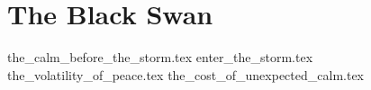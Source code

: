\part{The Black Swan}

{the_calm_before_the_storm.tex}
{enter_the_storm.tex}
{the_volatility_of_peace.tex}
{the_cost_of_unexpected_calm.tex}